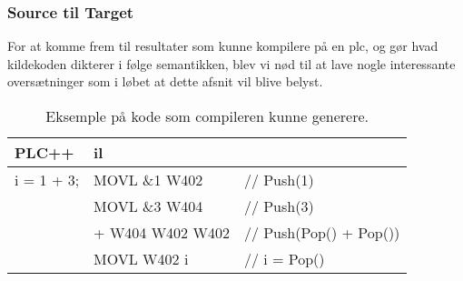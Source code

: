 \subsubsection{Source til Target}
For at komme frem til resultater som kunne kompilere på en \gls{plc}, og gør hvad kildekoden dikterer i følge semantikken, blev vi nød til at lave nogle interessante oversætninger som i løbet at dette afsnit vil blive belyst.

\begin{table}[H]
    \centering\ttfamily
    \begin{tabular}{l|l l}
        PLC++       & \gls{il} \\\hline
        i = 1 + 3;  & MOVL \&1 W402     &// Push(1)\\
                    & MOVL \&3 W404     &// Push(3)\\
                    & + W404 W402 W402  &// Push(Pop() + Pop())\\
                    & MOVL W402 i       &// i = Pop()
    \end{tabular}
    \caption{Eksemple på kode som compileren kunne generere.}
    \label{tab:codegenExample}
\end{table}

